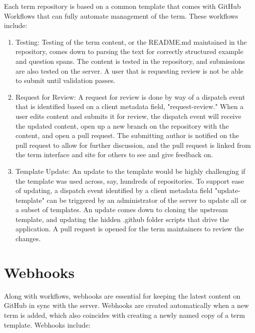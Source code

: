 \documentclass{jors}
\begin{document}
Each term repository is based on a common template \cite{tech-spec} that comes with GitHub Workflows \cite{github-workflows} that
can fully automate management of the term. These workflows include:

\begin{enumerate}
\item Testing: Testing of the term content, or the README.md maintained in the repository, comes down to parsing the text for correctly structured example and question spans. The content is tested in the repository, and submissions are also tested on the server. A user that is requesting review is not be able to submit until validation passes.
\item Request for Review: A request for review is done by way of a dispatch event \cite{github-dispatch} that is identified based on a client metadata field, "request-review." When a user edits content and submits it for review, the dispatch event will receive the updated content, open up a new branch on the repository with the content, and open a pull request. The submitting author is notified on the pull request to allow for further discussion, and the pull request is linked from the term interface and site for others to see and give feedback on.
\item Template Update: An update to the template would be highly challenging if the template was used across, say, hundreds of repositories. To support ease of updating, a dispatch event identified by a client metadata field "update-template" can be triggered by an administrator of the server to update all or a subset of templates. An update comes down to cloning the upstream template, and updating the hidden .github folder scripts that drive the application. A pull request is opened for the term maintainers to review the changes.
\end{enumerate}

\section*{Webhooks}

Along with workflows, webhooks are essential for keeping the latest content on GitHub in sync with the server. Webhooks are created automatically when a new term is added, which also coincides with creating a newly named copy of a term template. Webhooks include:
\end{document}

